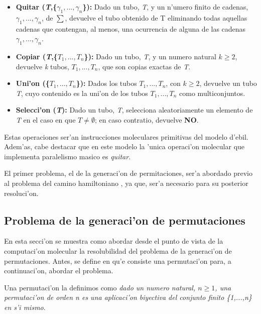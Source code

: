 \documentclass[12pt]{article}
\begin{document}
\begin{itemize}
    \item \textbf{Quitar (\textit{T},\{$ \gamma_{1},...,\gamma_{n} $\}):} Dado un tubo, \textit{T}, y un n'umero finito
    de cadenas, $ \gamma_{1},...,\gamma_{n} $, de $ \sum $, devuelve el tubo obtenido de T eliminando
    todas aquellas cadenas que contengan, al menos, una ocurrencia de alguna de las cadenas
    $ \gamma_{1},...,\gamma_{n} $.
    \item \textbf{Copiar (\textit{T},\{$ \textit{T}_{1},...,\textit{T}_{n} $\}):} Dado un tubo, \textit{T}, y un numero
    natural $ \textit{k} \geq 2 $, devuelve \textit{k} tubos, $\textit{T}_{1},...,\textit{T}_{n}$, que son
    copias exactas de \textit{T}.
    \item \textbf{Uni'on (\{$ \textit{T}_{1},...,\textit{T}_{n} $\}):} Dados los tubos
    $\textit{T}_{1},...,\textit{T}_{n}$, con $ \textit{k} \geq 2 $, devuelve un tubo \textit{T}, cuyo contenido
    es la uni'on de los tubos $\textit{T}_{1},...,\textit{T}_{n}$ como multiconjuntos.
    \item \textbf{Selecci'on (\textit{T}):} Dado un tubo, \textit{T}, selecciona aleatoriamente un elemento de \textit{T}
    en el caso en que $\textit{T} \neq \emptyset$; en caso contratio, devuelve \textbf{NO}.
\end{itemize}

Estas operaciones ser'an instrucciones moleculares primitivas del modelo d'ebil. Adem'as, cabe destacar que
en este modelo la 'unica operaci'on molecular que implementa paralelismo masico es \textit{quitar}.

El primer problema, el de la generaci'on de permitaciones, ser'a abordado previo al problema del camino hamiltoniano
, ya que, ser'a necesario para su posterior resoluci'on.

\subsection{Problema de la generaci'on de permutaciones}

En esta secci'on se muestra como abordar desde el punto de vista de la computaci'on molecular la resolubilidad
del problema de la generaci'on de permutaciones. Antes, se define en qu'e consiste una permutaci'on para, a
continuaci'on, abordar el problema.

Una permutaci'on la definimos como \textit{dado un numero natural, $n \geq 1$, una permutaci'on de orden n es una
aplicaci'on biyectiva del conjunto finito \{1,...,n\} en s'i mismo}.
\end{document}
